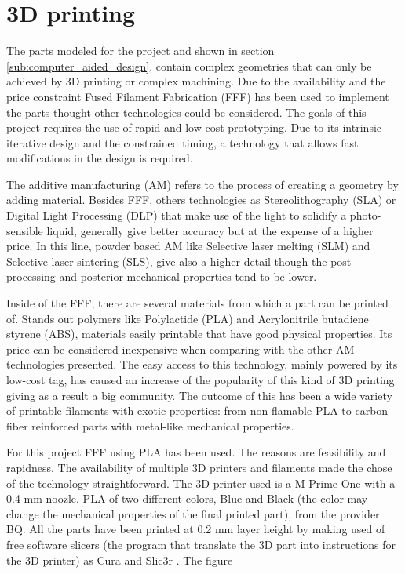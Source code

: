 \section{3D printing} %
\label{sec:3d_printing}
The parts modeled for the project and shown in section \ref{sub:computer_aided_design}, contain complex geometries that can only be achieved by 3D printing or complex machining.
Due to the availability and the price constraint Fused Filament Fabrication (FFF) has been used to implement the parts thought other technologies could be considered.
The goals of this project requires the use of rapid and low-cost prototyping. 
Due to its intrinsic iterative design and the constrained timing, a technology that allows fast modifications in the design is required.

The additive manufacturing (AM) refers to the process of creating a geometry by adding material.
Besides FFF, others technologies as Stereolithography (SLA) or Digital Light Processing (DLP) that make use of the light to solidify a photo-sensible liquid, generally give better accuracy but at the expense of a higher price.
In this line, powder based AM like Selective laser melting (SLM) and Selective laser sintering (SLS), give also a higher detail though the post-processing and posterior mechanical properties tend to be lower.

Inside of the FFF, there are several materials from which a part can be printed of.
Stands out polymers like Polylactide (PLA) and Acrylonitrile butadiene styrene (ABS), materials easily printable that have good physical properties.
Its price can be considered inexpensive when comparing with the other AM technologies presented.
The easy access to this technology, mainly powered by its low-cost tag, has caused an increase of the popularity of this kind of 3D printing giving as a result a big community.
The outcome of this has been a wide variety of printable filaments with exotic properties: from non-flamable PLA to carbon fiber reinforced parts with metal-like mechanical properties.

For this project FFF using PLA has been used.
The reasons are feasibility and rapidness.
The availability of multiple 3D printers and filaments made the chose of the technology straightforward.
The 3D printer used is a M Prime One \cite{m_prime_one} with a 0.4 mm noozle.
PLA of two different colors, Blue and Black (the color may change the mechanical properties of the final printed part), from the provider BQ.
All the parts have been printed at 0.2 mm layer height by making used of free software slicers (the program that translate the 3D part into instructions for the 3D printer) as Cura \cite{cura} and Slic3r \cite{slic3r}.
The figure

